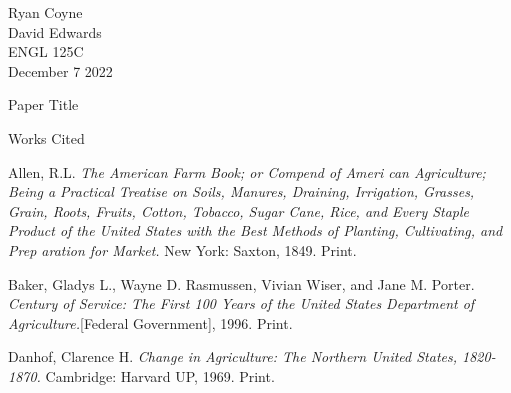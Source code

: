 \documentclass[12pt]{article}
\newcommand{\bibent}{\noindent \hangindent 40pt}
\newenvironment{workscited}{\newpage \begin{center} Works Cited \end{center}}{\newpage }
\begin{document}
\begin{flushleft}

Ryan Coyne\\
David Edwards\\
ENGL 125C\\
December 7 2022\\


\begin{center}
Paper Title
\end{center}


\setlength{\parindent}{0.5in}


\begin{workscited}

\bibent
Allen, R.L. \textit{The American Farm Book; or Compend of Ameri can Agriculture; Being a Practical Treatise on Soils, Manures, Draining, Irrigation, Grasses, Grain, Roots, Fruits, Cotton, Tobacco, Sugar Cane, Rice, and Every Staple Product of the United States with the Best Methods of Planting, Cultivating, and Prep aration for Market.} New York: Saxton, 1849. Print.

\bibent
Baker, Gladys L., Wayne D. Rasmussen, Vivian Wiser, and Jane M. Porter. \textit{Century of Service: The First 100 Years of the United States Department of Agriculture.}[Federal Government], 1996. Print.

\bibent
Danhof, Clarence H. \textit{Change in Agriculture: The Northern United States, 1820-1870.} Cambridge: Harvard UP, 1969. Print.


\end{workscited}

\end{flushleft}
\end{document}
